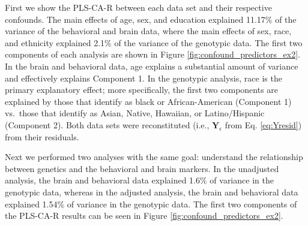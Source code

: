 \documentclass[12pt]{article}
\begin{document}
First we show the PLS-CA-R between each data set and their respective
confounds. The main effects of age, sex, and education explained 11.17\%
of the variance of the behavioral and brain data, where the main effects
of sex, race, and ethnicity explained 2.1\% of the variance of the
genotypic data. The first two components of each analysis are shown in
Figure \ref{fig:confound_predictors_ex2}. In the brain and behavioral
data, age explains a substantial amount of variance and effectively
explains Component 1. In the genotypic analysis, race is the primary
explanatory effect; more specifically, the first two components are
explained by those that identify as black or African-American (Component
1) vs.~those that identify as Asian, Native, Hawaiian, or
Latino/Hispanic (Component 2). Both data sets were reconstituted (i.e.,
\({\mathbf Y}_{\epsilon}\) from Eq. \ref{eq:Yresid}) from their
residuals.

Next we performed two analyses with the same goal: understand the
relationship between genetics and the behavioral and brain markers. In
the unadjusted analysis, the brain and behavioral data explained 1.6\%
of variance in the genotypic data, whereas in the adjusted analysis, the
brain and behavioral data explained 1.54\% of variance in the genotypic
data. The first two components of the PLS-CA-R results can be seen in
Figure \ref{fig:confound_predictors_ex2}.
\end{document}
